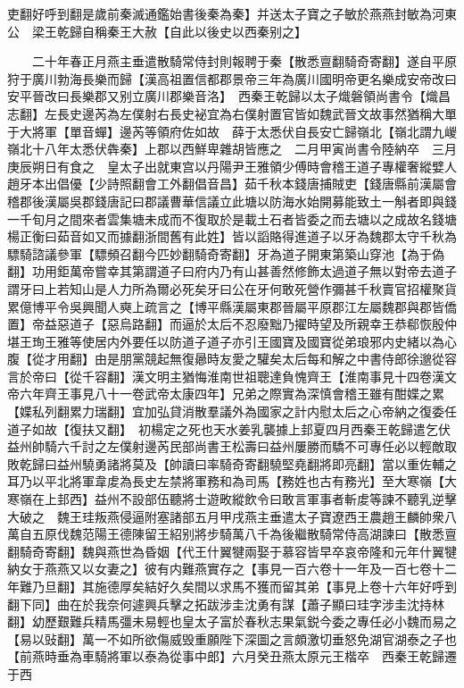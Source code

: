 吏翻好呼到翻是歲前秦滅通鑑始書後秦為秦】并送太子寶之子敏於燕燕封敏為河東公　梁王乾歸自稱秦王大赦【自此以後史以西秦别之】

　　二十年春正月燕主垂遣散騎常侍封則報聘于秦【散悉亶翻騎奇寄翻】遂自平原狩于廣川勃海長樂而歸【漢高祖置信都郡景帝三年為廣川國明帝更名樂成安帝改曰安平晉改曰長樂郡又别立廣川郡樂音洛】　西秦王乾歸以太子熾磐領尚書令【熾昌志翻】左長史邊芮為左僕射右長史袐宜為右僕射置官皆如魏武晉文故事然猶稱大單于大將軍【單音蟬】邊芮等領府佐如故　薛于太悉伏自長安亡歸嶺北【嶺北謂九嵕嶺北十八年太悉伏犇秦】上郡以西鮮卑雜胡皆應之　二月甲寅尚書令陸納卒　三月庚辰朔日有食之　皇太子出就東宫以丹陽尹王雅領少傅時會稽王道子專權奢縱嬖人趙牙本出倡優【少詩照翻會工外翻倡音昌】茹千秋本錢唐捕賊吏【錢唐縣前漢屬會稽郡後漢屬吳郡錢唐記曰郡議曹華信議立此塘以防海水始開募能致土一斛者即與錢一千旬月之間來者雲集塘未成而不復取於是載土石者皆委之而去塘以之成故名錢塘楊正衡曰茹音如又而據翻浙間舊有此姓】皆以謟賂得進道子以牙為魏郡太守千秋為驃騎諮議參軍【驃頻召翻今匹妙翻騎奇寄翻】牙為道子開東第築山穿池【為于偽翻】功用鉅萬帝嘗幸其第謂道子曰府内乃有山甚善然修飾太過道子無以對帝去道子謂牙曰上若知山是人力所為爾必死矣牙曰公在牙何敢死營作彌甚千秋賣官招權聚貨累億博平令吳興聞人奭上疏言之【博平縣漢屬東郡晉屬平原郡江左屬魏郡與郡皆僑置】帝益惡道子【惡烏路翻】而逼於太后不忍廢黜乃擢時望及所親幸王恭郗恢殷仲堪王珣王雅等使居内外要任以防道子道子亦引王國寶及國寶從弟琅邪内史緒以為心腹【從才用翻】由是朋黨競起無復曏時友愛之驩矣太后每和解之中書侍郎徐邈從容言於帝曰【從千容翻】漢文明主猶悔淮南世祖聰達負愧齊王【淮南事見十四卷漢文帝六年齊王事見八十一卷武帝太康四年】兄弟之際實為深慎會稽王雖有酣媟之累【媟私列翻累力瑞翻】宜加弘貸消散羣議外為國家之計内慰太后之心帝納之復委任道子如故【復扶又翻】　初楊定之死也天水姜乳襲據上邽夏四月西秦王乾歸遣乞伏益州帥騎六千討之左僕射邊芮民部尚書王松壽曰益州屢勝而驕不可專任必以輕敵取敗乾歸曰益州驍勇諸將莫及【帥讀曰率騎奇寄翻驍堅堯翻將即亮翻】當以重佐輔之耳乃以平北將軍韋䖍為長史左禁將軍務和為司馬【務姓也古有務光】至大寒嶺【大寒嶺在上邽西】益州不設部伍聽將士遊畋縱飲令曰敢言軍事者斬䖍等諫不聽乳逆擊大破之　魏王珪叛燕侵逼附塞諸部五月甲戌燕主垂遣太子寶遼西王農趙王麟帥衆八萬自五原伐魏范陽王德陳留王紹别將步騎萬八千為後繼散騎常侍高湖諫曰【散悉亶翻騎奇寄翻】魏與燕世為昏姻【代王什翼犍兩娶于慕容皆早卒哀帝隆和元年什翼犍納女于燕燕又以女妻之】彼有内難燕實存之【事見一百六卷十一年及一百七卷十二年難乃旦翻】其施德厚矣結好久矣間以求馬不獲而留其弟【事見上卷十六年好呼到翻下同】曲在於我奈何遽興兵擊之拓跋涉圭沈勇有謀【蕭子顯曰珪字涉圭沈持林翻】幼歷艱難兵精馬彊未易輕也皇太子富於春秋志果氣鋭今委之專任必小魏而易之【易以䜴翻】萬一不如所欲傷威毁重願陛下深圖之言頗激切垂怒免湖官湖泰之子也【前燕時垂為車騎將軍以泰為從事中郎】六月癸丑燕太原元王楷卒　西秦王乾歸遷于西

